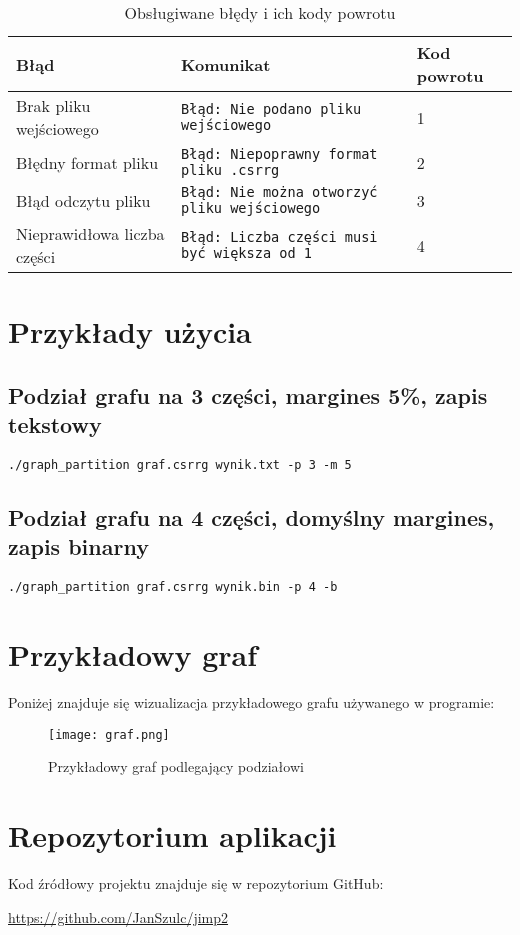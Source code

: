 \documentclass{article}
\begin{document}
\begin{table}[h]
\centering
\begin{tabular}{|l|l|l|}
\hline
\textbf{Błąd} & \textbf{Komunikat} & \textbf{Kod powrotu} \\
\hline
Brak pliku wejściowego & \texttt{Błąd: Nie podano pliku wejściowego} & 1 \\
\hline
Błędny format pliku & \texttt{Błąd: Niepoprawny format pliku .csrrg} & 2 \\
\hline
Błąd odczytu pliku & \texttt{Błąd: Nie można otworzyć pliku wejściowego} & 3 \\
\hline
Nieprawidłowa liczba części & \texttt{Błąd: Liczba części musi być większa od 1} & 4 \\
\hline
\end{tabular}
\caption{Obsługiwane błędy i ich kody powrotu}
\label{tab:1}
\end{table}

\section{Przykłady użycia}
\subsection{Podział grafu na 3 części, margines 5\%, zapis tekstowy}
\begin{verbatim}
./graph_partition graf.csrrg wynik.txt -p 3 -m 5
\end{verbatim}

\subsection{Podział grafu na 4 części, domyślny margines, zapis binarny}
\begin{verbatim}
./graph_partition graf.csrrg wynik.bin -p 4 -b
\end{verbatim}

\section{Przykładowy graf}
Poniżej znajduje się wizualizacja przykładowego grafu używanego w programie:
\begin{figure}[h]
    \centering
    \texttt{[image: graf.png]}
    \caption{Przykładowy graf podlegający podziałowi}
    \label{fig:graph}
\end{figure}

\section{Repozytorium aplikacji}
Kod źródłowy projektu znajduje się w repozytorium GitHub:
\begin{center}
\href{https://github.com/JanSzulc/jimp2}{https://github.com/JanSzulc/jimp2}
\end{center}
\newpage
\end{document}
